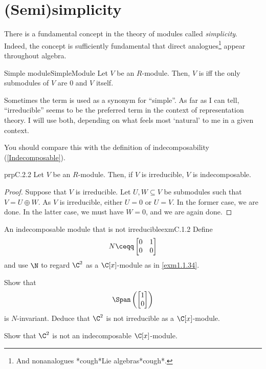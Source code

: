\section{(Semi)simplicity}

There is a fundamental concept in the theory of modules called \emph{simplicity}.  Indeed, the concept is sufficiently fundamental that direct analogues\footnote{And nonanalogues *cough*Lie algebras*cough*.} appear throughout algebra.
\begin{dfn}{Simple module}{SimpleModule}
	Let $V$ be an $R$-module.  Then, $V$ is  iff the only submodules of $V$ are $0$ and $V$ itself.
	\begin{rmk}
		Sometimes the term  is used as a synonym for ``simple''.  As far as I can tell, ``irreducible'' seems to be the preferred term in the context of representation theory.  I will use both, depending on what feels most `natural' to me in a given context.
	\end{rmk}
	\begin{rmk}
		You should compare this with the definition of indecomposability (\cref{Indecomposable}).
	\end{rmk}
\end{dfn}
\begin{prp}{}{prpC.2.2}
	Let $V$ be an $R$-module.  Then, if $V$ is irreducible, $V$ is indecomposable.
	\begin{proof}
		Suppose that $V$ is irreducible.  Let $U,W\subseteq V$ be submodules such that $V=U\oplus W$.  As $V$ is irreducible, either $U=0$ or $U=V$.  In the former case, we are done.  In the latter case, we must have $W=0$, and we are again done.
	\end{proof}
\end{prp}
\begin{exm}{An indecomposable module that is not irreducible}{exmC.1.2}
	Define
	\begin{equation}
		N\ceqq \begin{bmatrix}0 & 1 \\ 0 & 0\end{bmatrix}
	\end{equation}
	and use $\N$ to regard $\C ^2$ as a $\C [x]$-module as in \cref{exm1.1.34}.
	
	\begin{exr}[breakable=false]{}{}
		Show that
		\begin{equation}
			\Span \left( \begin{bmatrix}1 \\ 0\end{bmatrix}\right) 
		\end{equation}
		is $N$-invariant.  Deduce that $\C ^2$ is not irreducible as a $\C [x]$-module.
	\end{exr}
	\begin{exr}[breakable=false]{}{}
		Show that $\C ^2$ is not an indecomposable $\C [x]$-module.
	\end{exr}
\end{exm}

